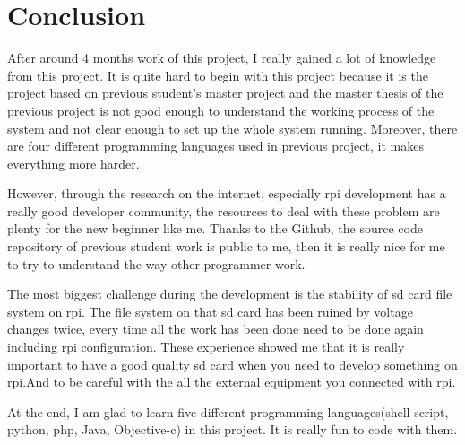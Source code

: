 \chapter{Conclusion}
\label{chp:conclusion}

\par After around 4 months work of this project, I really gained a lot of knowledge from this project. It is quite hard to begin with this project because it is the project based on previous student's master project and the master thesis of the previous project is not good enough to understand the working process of the system and not clear enough to set up the whole system running. Moreover, there are four different programming languages used in previous project, it makes everything more harder.
\par However, through the research on the internet, especially \gls{rpi} development has a really good developer community, the resources to deal with these problem are plenty for the new beginner like me. Thanks to the Github, the source code repository of previous student work is public to me, then it is really nice for me to try to understand the way other programmer work.
\par The most biggest challenge during the development is the stability of \gls{sd} card file system on \gls{rpi}. The file system on that \gls{sd} card has been ruined by voltage changes twice, every time all the work has been done need to be done again including \gls{rpi} configuration. These experience showed me that it is really important to have a good quality \gls{sd} card when you need to develop something on \gls{rpi}.And to be careful with the all the external equipment you connected with \gls{rpi}.
\par At the end, I am glad to learn five different programming languages(shell script, python, \gls{php}, Java, Objective-c) in this project. It is really fun to code with them.